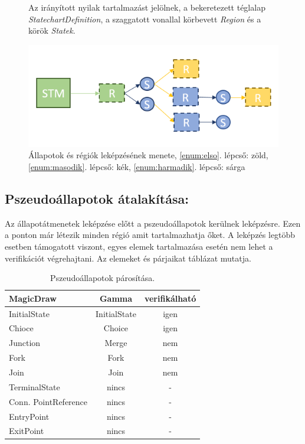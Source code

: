 \begin{figure}[H]
Az irányított nyilak tartalmazást jelölnek, a bekeretezett téglalap \emph{StatechartDefinition}, a szaggatott vonallal körbevett \emph{Region} és a körök \emph{Statek}.

\centering
\includegraphics[keepaspectratio, width=140mm]{figures/transformation.png}
\caption{Állapotok és régiók leképzésének menete, \ref{enum:elso}. lépcső: zöld, \ref{enum:masodik}. lépcső: kék, \ref{enum:harmadik}. lépcső: sárga}
\label{fig:state-transformation}
\end{figure}

\subsection{Pszeudoállapotok átalakítása:}
Az állapotátmenetek leképzése előtt a pszeudoállapotok kerülnek leképzésre. Ezen a ponton már létezik minden régió amit tartalmazhatja őket. A leképzés legtöbb esetben támogatott viszont, egyes elemek tartalmazása esetén nem lehet a verifikációt végrehajtani. Az elemeket és párjaikat  táblázat mutatja.

\begin{table}[!h]
	\footnotesize
	\centering
	\begin{tabular}{ l c c }
		MagicDraw & Gamma & verifikálható \\ \hline
		InitialState & InitialState & igen \\
		Chioce & Choice & igen \\
		Junction & Merge & nem \\
		Fork & Fork & nem \\
		Join & Join & nem \\
		TerminalState & nincs & - \\
		Conn. PointReference & nincs & - \\
		EntryPoint & nincs & - \\
		ExitPoint & nincs & -
		
	\end{tabular}
	\caption{Pszeudoállapotok párosítása.}
	\label{table:pseudo}
\end{table}

